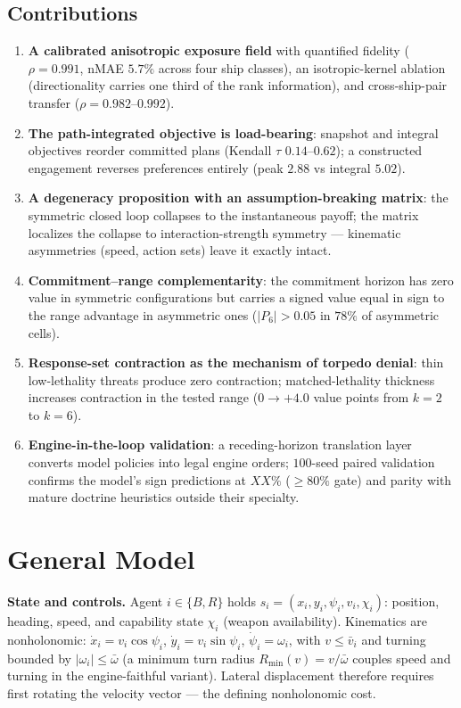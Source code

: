 \documentclass[12pt,a4paper]{article}
\begin{document}
\subsection{Contributions}
\begin{enumerate}
\item \textbf{A calibrated anisotropic exposure field} with quantified
fidelity ($\rho=0.991$, nMAE $5.7\%$ across four ship classes), an
isotropic-kernel ablation (directionality carries one third of the rank
information), and cross-ship-pair transfer ($\rho=0.982$--$0.992$).
\item \textbf{The path-integrated objective is load-bearing}: snapshot and
integral objectives reorder committed plans (Kendall $\tau$ $0.14$--$0.62$);
a constructed engagement reverses preferences entirely (peak $2.88$ vs
integral $5.02$).
\item \textbf{A degeneracy proposition with an assumption-breaking matrix}:
the symmetric closed loop collapses to the instantaneous payoff; the matrix
localizes the collapse to interaction-strength symmetry --- kinematic
asymmetries (speed, action sets) leave it exactly intact.
\item \textbf{Commitment--range complementarity}: the commitment horizon has
zero value in symmetric configurations but carries a signed value equal in
sign to the range advantage in asymmetric ones ($|P_6|>0.05$ in $78\%$ of
asymmetric cells).
\item \textbf{Response-set contraction as the mechanism of torpedo denial}:
thin low-lethality threats produce zero contraction; matched-lethality
thickness increases contraction in the tested range ($0\to+4.0$ value points from
$k{=}2$ to $k{=}6$).
\item \textbf{Engine-in-the-loop validation}: a receding-horizon translation
layer converts model policies into legal engine orders; $100$-seed paired
validation confirms the model's sign predictions at $XX\%$ ($\ge80\%$ gate)
and parity with mature doctrine heuristics outside their specialty.
\end{enumerate}

\section{General Model}\label{sec:model}

\noindent\textbf{State and controls.}  Agent $i\in\{B,R\}$ holds
$s_i=(x_i,y_i,\psi_i,v_i,\chi_i)$: position, heading, speed, and capability
state $\chi_i$ (weapon availability).  Kinematics are nonholonomic:
$\dot x_i=v_i\cos\psi_i$, $\dot y_i=v_i\sin\psi_i$, $\dot\psi_i=\omega_i$,
with $v\le\bar v_i$ and turning bounded by $|\omega_i|\le\bar\omega$ (a
minimum turn radius $R_{\min}(v)=v/\bar\omega$ couples speed and turning in
the engine-faithful variant).  Lateral displacement therefore requires first
rotating the velocity vector --- the defining nonholonomic cost.
\end{document}
